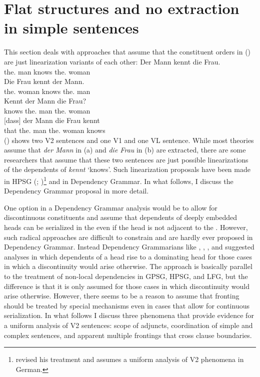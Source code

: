 \section{Flat structures and no extraction in simple sentences}

This section deals with approaches that assume that the constituent orders in () are just
linearization variants of each other:
\eal
\ex
\gll Der Mann kennt die Frau.\\
     the.\nom{} man  knows the.\acc{} woman\\
\ex
\gll Die Frau kennt der Mann.\\
     the.\acc{} woman knows the.\nom{} man\\
\ex
\gll Kennt der Mann die Frau?\\
     knows the.\nom{} man the.\acc{} woman\\
\ex
\gll {}[dass] der Mann die Frau kennt\\
     \spacebr{}that the.\nom{} man the.\acc{} woman knows\\     
\zl
() shows two V2 sentences and one V1 and one VL sentence. While most theories assume that
\emph{der Mann} in (a) and \emph{die Frau} in (b) are extracted, there are some
researchers that assume that these two sentences are just possible linearizations of the dependents
of \emph{kennt} `knows'. Such linearization proposals have been made in HPSG
(\citealp[Chapter~6.3]{Kathol95a}; \citealp{Wetta2011a,Wetta2014a-u})\footnote{
  \citet{Kathol2001a} revised his treatment and assumes a uniform analysis of V2 phenomena in German.}
and in Dependency Grammar. In what follows, I discuss the Dependency Grammar proposal in more detail.

One option in a Dependency Grammar analysis would be to allow for discontinuous constituents and
assume that dependents of deeply embedded heads can be serialized in the \vf even if the head is not
adjacent to the \vf. However, such radical approaches are difficult to constrain
\citep[]{MuellerGT-Eng1} and are hardly ever proposed in Dependency Grammar. Instead Dependency
Grammarians like \citet{Kunze68a-u}, \citet{Hudson97a,Hudson2000a}, \citet*{KNR98a},
and \citet{GO2009a}
suggested analyses in which dependents of a head rise
to a dominating head for those cases in which a discontinuity would arise otherwise. The approach is
basically parallel to the treatment of non-local dependencies in GPSG, HPSG, and LFG, but the
difference is that it is only assumed for those cases in which discontinuity would arise
otherwise. However, there seems to be a reason to assume that fronting should be treated by special mechanisms even in cases
that allow for continuous serialization. In what follows I discuss three phenomena that provide
evidence for a uniform analysis of V2 sentences: scope of adjuncts, coordination of simple and
complex sentences, and apparent multiple frontings that cross clause boundaries.

